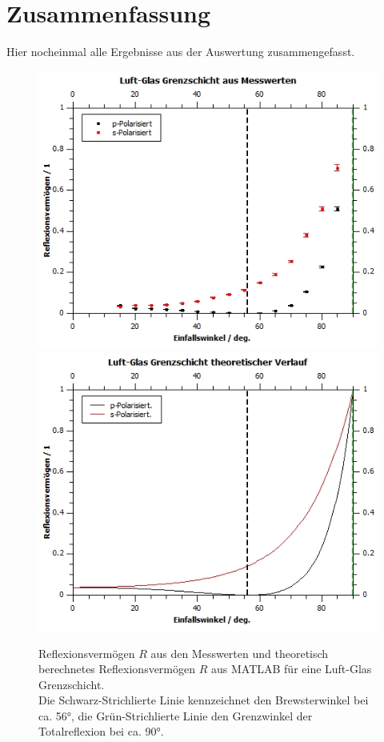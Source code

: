 \documentclass[12pt,a4paper,twoside]{article}
\begin{document}
\section{Zusammenfassung} %
Hier nocheinmal alle Ergebnisse aus der Auswertung zusammengefasst. 

\begin{figure}[H]
    \centering
    \includegraphics[width=0.6\linewidth]{nudes/LG Mess.jpg}
    \includegraphics[width=0.6\linewidth]{nudes/LG theor.jpg}
    \caption{Reflexionsvermögen $R$ aus den Messwerten und theoretisch berechnetes Reflexionsvermögen $R$ aus MATLAB für eine Luft-Glas Grenzschicht. \\
    Die Schwarz-Strichlierte Linie kennzeichnet den Brewsterwinkel bei ca. 56°, die Grün-Strichlierte Linie den Grenzwinkel der Totalreflexion bei ca. 90°. }
    \label{fig:zus reflexionsvermögen LG}
\end{figure}
\end{document}
